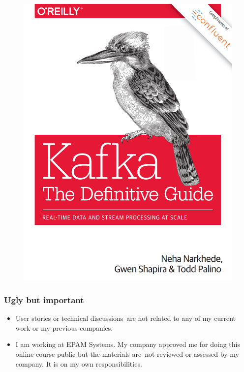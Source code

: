 \begin{frame}
\begin{figure}[ht]
\begin{minipage}[c][1\width]{
		0.3\textwidth}
	\includegraphics[width=\linewidth]{./Figures/chapter-00/kafka-tdg.png}
\end{minipage}

\end{figure}
\end{frame}


\begin{frame}
\frametitle{Ugly but important}

\begin{itemize}
	\item User stories or technical discussions are not related to any of my current work or my previous companies.
	\item I am working at EPAM Systems. My company approved me for doing this online course public but the materials are not reviewed or assessed by my company. It is on my own responsibilities.
\end{itemize}
\end{frame}


